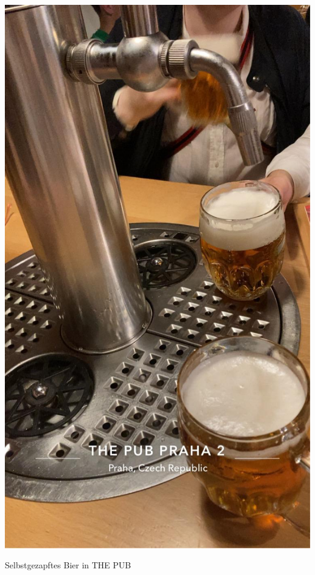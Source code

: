 \begin{center}
\begin{figurehere}
\includegraphics[width=.7\linewidth]{./Bilder/1.5BackToTheRootsAktivenfahrtPrag/5.bild.jpeg} 
  \caption{Selbstgezapftes Bier in THE PUB}
\end{figurehere}
\end{center}

